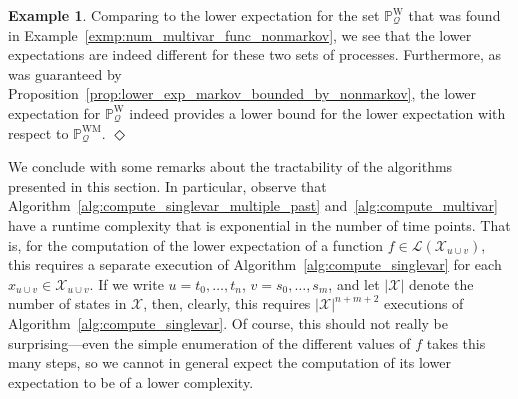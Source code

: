 \documentclass[10pt,a4paper]{paper}
\theoremstyle{definition}
\newtheorem{exmp}{Example}%
\newcommand{\states}{\mathcal{X}}
\newcommand{\processes}{\mathbb{P}}
\newcommand{\wprocesses}{\processes^{\mathrm{W}}}
\newcommand{\wmprocesses}{\processes^{\mathrm{WM}}}
\newcommand{\gambles}{\mathcal{L}}
\newcommand{\rateset}{\mathcal{Q}}
\newcommand{\abs}[1]{\left\vert #1 \right\vert}
\newcommand{\exampleend}{\hfill$\Diamond$}
\begin{document}
\begin{exmp}
Comparing to the lower expectation for the set $\wprocesses_\rateset$ that was found in Example~\ref{exmp:num_multivar_func_nonmarkov}, we see that the lower expectations are indeed different for these two sets of processes. Furthermore, as was guaranteed by Proposition~\ref{prop:lower_exp_markov_bounded_by_nonmarkov}, the lower expectation for $\wprocesses_\rateset$ indeed provides a lower bound for the lower expectation with respect to $\wmprocesses_\rateset$.
\exampleend
\end{exmp}

We conclude with some remarks about the tractability of the algorithms presented in this section. In particular, observe that Algorithm~\ref{alg:compute_singlevar_multiple_past} and~\ref{alg:compute_multivar} have a runtime complexity that is exponential in the number of time points. That is, for the computation of the lower expectation of a function $f\in\gambles(\states_{u\cup v})$, this requires a separate execution of Algorithm~\ref{alg:compute_singlevar} for each $x_{u\cup v}\in\states_{u\cup v}$. If we write $u=t_0,\ldots,t_n$, $v=s_0,\ldots,s_m$, and let $\abs{\states}$ denote the number of states in $\states$, then, clearly, this requires $\abs{\states}^{n+m+2}$ executions of Algorithm~\ref{alg:compute_singlevar}. Of course, this should not really be surprising---even the simple enumeration of the different values of $f$ takes this many steps, so we cannot in general expect the computation of its lower expectation to be of a lower complexity.
\end{document}
